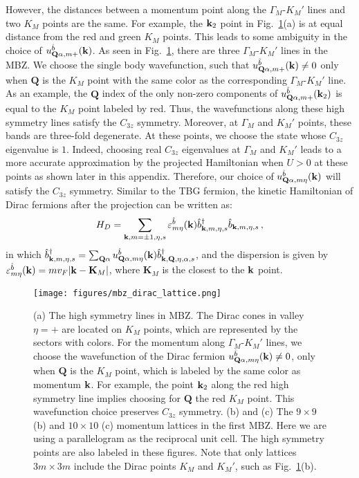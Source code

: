 \documentclass[prb,aps,nofootinbib,amssymb,twocolumn,superscriptaddress,10pt]{revtex4-2}
\begin{document}
\begin{widetext}
However, the distances between a momentum point along the $\Gamma_M$-$K_M'$ lines and two $K_M$ points are the same. For example, the $\mathbf{k}_2$ point in Fig.~\ref{fig:mbz_dirac}(a) is at equal distance from the red and green $K_M$ points. This leads to some ambiguity in the choice of $u^{\hat{b}}_{\mathbf{Q}\alpha,m+}(\mathbf{k})$. 
As seen in Fig.~\ref{fig:mbz_dirac}, there are three $\Gamma_M$-$K_M'$ lines in the MBZ. We choose the single body wavefunction, such that $u^{\hat{b}}_{\mathbf{Q}\alpha,m+}(\mathbf{k}) \neq 0$ only when $\mathbf{Q}$ is the $K_M$ point with the same color as the corresponding $\Gamma_M$-$K_M'$ line. As an example, the $\mathbf{Q}$ index of the only non-zero components of $u^{\hat{b}}_{\mathbf{Q}\alpha,m+}(\mathbf{k}_2)$ is equal to the $K_M$ point labeled by red. 
Thus, the wavefunctions along these high symmetry lines satisfy the $C_{3z}$ symmetry.
Moreover, at $\Gamma_M$ and $K_M'$ points, these bands are three-fold degenerate. At these points, we choose the state whose $C_{3z}$ eigenvalue is $1$. Indeed, choosing real $C_{3z}$ eigenvalues at $\Gamma_M$ and $K_M'$ leads to a more accurate approximation by the projected Hamiltonian when $U>0$ at these points as shown later in this appendix. Therefore, our choice of $u^{\hat{b}}_{\mathbf{Q}\alpha,m\eta}(\mathbf{k})$ will satisfy the $C_{3z}$ symmetry. Similar to the TBG fermion, the kinetic Hamiltonian of Dirac fermions after the projection can be written as:
\begin{equation}\label{eqn:h_D_appendix}
	H_D = \sum_{\mathbf{k},m=\pm1,\eta,s}\varepsilon^{\hat{b}}_{m\eta}(\mathbf{k})\hat{b}^\dagger_{\mathbf{k},m,\eta,s}\hat{b}_{\mathbf{k},m,\eta,s}\,,
\end{equation}
in which $\hat{b}^\dagger_{\mathbf{k},m,\eta,s} = \sum_{\mathbf{Q}\alpha}u^{\hat{b}}_{\mathbf{Q}\alpha,m\eta}(\mathbf{k})\hat{b}^\dagger_{\mathbf{k},\mathbf{Q},\eta,\alpha,s}$, and the dispersion is given by $\varepsilon_{m\eta}^{\hat{b}}(\mathbf{k}) = m v_F |\mathbf{k} - \mathbf{K}_M|$, where $\mathbf{K}_M$ is the closest to the $\mathbf{k}$ point.

\begin{figure}
	\centering
	\texttt{[image: figures/mbz\_dirac\_lattice.png]}
	\caption{(a) The high symmetry lines in MBZ. The Dirac cones in valley $\eta = +$ are located on $K_M$ points, which are represented by the sectors with colors. For the momentum along $\Gamma_M$-$K_M'$ lines, we choose the wavefunction of the Dirac fermion $u^{\hat{b}}_{\mathbf{Q}\alpha,m\eta}(\mathbf{k}) \neq 0$, only when $\mathbf{Q}$ is the $K_M$ point, which is labeled by the same color as momentum $\mathbf{k}$. For example, the point $\mathbf{k}_2$ along the red high symmetry line implies choosing for $\mathbf{Q}$ the red $K_M$ point. This wavefunction choice preserves $C_{3z}$ symmetry. (b) and (c) The $9\times 9$ (b) and $10\times 10$ (c) momentum lattices in the first MBZ. Here we are using a parallelogram as the reciprocal unit cell. The high symmetry points are also labeled in these figures. Note that only lattices $3m\times 3m$ include the Dirac points $K_M$ and $K_M'$, such as Fig.~\ref{fig:mbz_dirac}(b).}
	\label{fig:mbz_dirac}
\end{figure}


\end{widetext}
\end{document}
